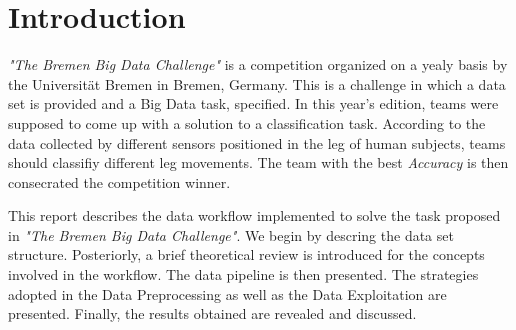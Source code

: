 %
%
%
%
%


\section{Introduction}

\textit{"The Bremen Big Data Challenge"} is a competition organized on a yealy
basis by the Universität Bremen in Bremen, Germany. This is a challenge in which 
a data set is provided and a Big Data task, specified. In this year's
edition, teams were supposed to come up with a solution to a classification 
task. According to the data collected by different sensors positioned in the leg
of human subjects, teams should classifiy different leg movements. The team with
the best \textit{Accuracy} is then consecrated the competition winner.

This report describes the data workflow implemented to solve the task proposed
in \textit{"The Bremen Big Data Challenge"}. We begin by descring the data
set structure. Posteriorly, a brief theoretical review is introduced for the 
concepts involved in the workflow. The data pipeline is then presented. The
strategies adopted in the Data Preprocessing as well as the Data Exploitation
are presented. Finally, the results obtained are revealed and discussed.


